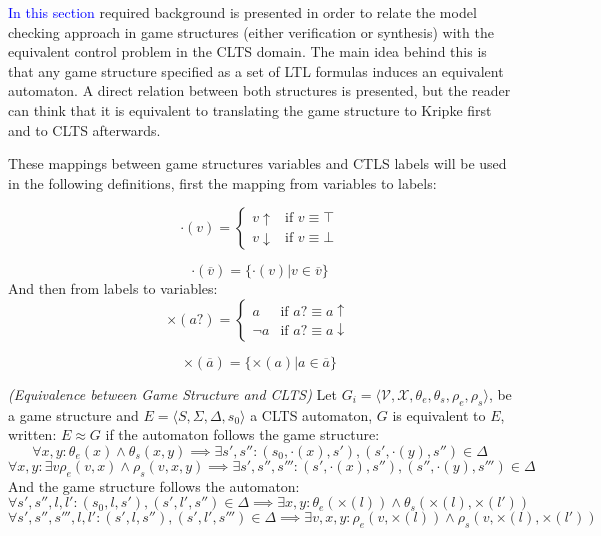 \textcolor{blue}{In this section} required background is presented in order to relate the model checking approach in game structures (either verification or synthesis) with the equivalent control problem in the CLTS domain.  The main idea behind this is that any game structure specified as a set of LTL formulas induces an equivalent automaton. A direct relation between both structures is presented, but the reader can think that it is equivalent to translating the game structure to Kripke first and to CLTS afterwards.

These mappings between game structures variables and CTLS labels will be used in the following definitions, first the mapping from variables to labels:

\[
\cdot(v) = \begin{cases}
v\uparrow & \text{if } v \equiv \top \\
v\downarrow & \text{if } v \equiv \bot
\end{cases}
\]

\[\cdot(\overline{v}) = \lbrace \cdot (v) | v \in \overline{v} \rbrace \]
And then from labels to variables:
\[
\times (a?) = \begin{cases}
a & \text{if } a? \equiv a\uparrow \\
\neg a & \text{if } a? \equiv a\downarrow
\end{cases}
\]

\[\times(\overline{a}) = \lbrace \times (a) | a \in \overline{a} \rbrace \]

\begin{definition}
	\label{def:gs_clts_equivalence} \emph{(Equivalence between Game Structure and CLTS)} 
	Let $G_i=\langle \mathcal{V}, \mathcal{X}, \theta_{e}, \theta_{s}, \rho_{e}, \rho_{s}\rangle$, be a game structure and $E=\langle S, \Sigma, \Delta, s_{0}\rangle$ a CLTS automaton, $G$ is equivalent to $E$, written: $E \approx G$ if the automaton follows the game structure:
	\[
	\forall x, y: \theta_e(x) \wedge \theta_s(x,y) \implies \exists s',s'' : (s_0, \cdot (x), s'), (s', \cdot (y), s'') \in \Delta 
	\] 
	\[
	\forall x, y : \exists v \rho_e(v,x) \wedge \rho_s(v,x,y) \implies \exists s',s'',s''' : (s', \cdot (x), s''), (s'', \cdot (y), s''') \in \Delta 
	\] 
And the game structure follows the automaton:	
\[
\forall  s',s'',l,l' : (s_0, l, s'), (s', l', s'') \in \Delta  \implies \exists x,y: \theta_e(\times(l)) \wedge \theta_s(\times(l),\times(l'))
\] 
\[
\forall  s',s'',s''',l,l' : (s', l, s''), (s', l', s''') \in \Delta  \implies \exists v,x,y: \rho_e(v,\times(l)) \wedge \rho_s(v,\times(l),\times(l'))
\] 	%
\end{definition}

